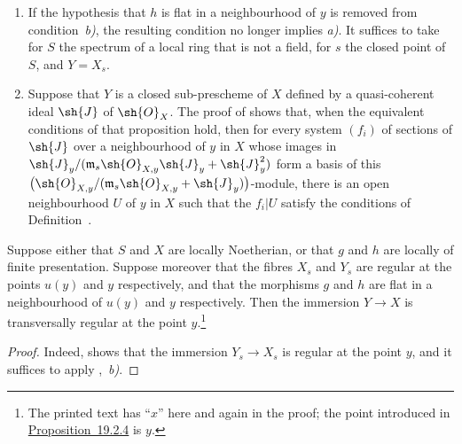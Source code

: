 \begin{remarks}[19.2.5]
\label{IV.19.2.5}
\medskip\noindent
\begin{enumerate}[label=(\roman*)]
  \item If the hypothesis that $h$ is flat in a neighbourhood of $y$ is removed from condition~\emph{b)}, the resulting condition no longer implies \emph{a)}.
It suffices to take for $S$ the spectrum of a local ring that is not a field, for $s$ the closed point of $S$, and $Y=X_s$.
  \item Suppose that $Y$ is a closed sub-prescheme of $X$ defined by a quasi-coherent ideal $\sh{J}$ of $\sh{O}_X$.
The proof of  shows that, when the equivalent conditions of that proposition hold, then for every system $(f_i)$ of sections of $\sh{J}$ over a neighbourhood of $y$ in $X$ whose images in $\sh{J}_y/(\mathfrak{m}_s\sh{O}_{X,y}\sh{J}_y+\sh{J}_y^2)$ form a basis of this $\bigl(\sh{O}_{X,y}/(\mathfrak{m}_s\sh{O}_{X,y}+\sh{J}_y)\bigr)$-module, there is an open neighbourhood $U$ of $y$ in $X$ such that the $f_i|U$ satisfy the conditions of Definition~.
\end{enumerate}
\end{remarks}

\begin{corollary}[19.2.6]
\label{IV.19.2.6}
Suppose either that $S$ and $X$ are locally Noetherian, or that $g$ and $h$ are locally of finite presentation.
Suppose moreover that the fibres $X_s$ and $Y_s$ are regular at the points $u(y)$ and $y$ respectively, and that the morphisms $g$ and $h$ are flat in a neighbourhood of $u(y)$ and $y$ respectively.
Then the immersion $Y\to X$ is transversally regular at the point $y$.\footnote{The printed text has ``$x$'' here and again in the proof; the point introduced in {\hyperlink{ega4.c04.prop.19-2-4}{Proposition~19.2.4}} is $y$.}
\end{corollary}

\begin{proof}
Indeed,  shows that the immersion $Y_s\to X_s$ is regular at the point $y$, and it suffices to apply ,~\emph{b)}.
\end{proof}

